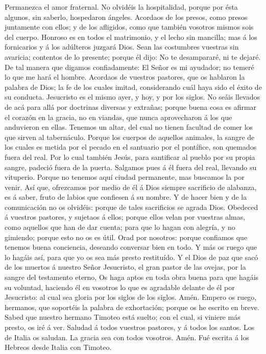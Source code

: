  Permanezca el amor fraternal.  No olvidéis la
hospitalidad, porque por ésta algunos, sin saberlo, hospedaron ángeles.
 Acordaos de los presos, como presos juntamente con ellos; y
de los afligidos, como que también vosotros mismos sois del cuerpo.
 Honroso es en todos el matrimonio, y el lecho sin mancilla;
mas á los fornicarios y á los adúlteros juzgará Dios.  Sean
las costumbres vuestras sin avaricia; contentos de lo presente; porque
él dijo: No te desampararé, ni te dejaré.  De tal manera que
digamos confiadamente: El Señor es mi ayudador; no temeré lo que me hará
el hombre.  Acordaos de vuestros pastores, que os hablaron
la palabra de Dios; la fe de los cuales imitad, considerando cuál haya
sido el éxito de su conducta.  Jesucristo es el mismo ayer,
y hoy, y por los siglos.  No seáis llevados de acá para allá
por doctrinas diversas y extrañas; porque buena cosa es afirmar el
corazón en la gracia, no en viandas, que nunca aprovecharon á los que
anduvieron en ellas.  Tenemos un altar, del cual no tienen
facultad de comer los que sirven al tabernáculo.  Porque
los cuerpos de aquellos animales, la sangre de los cuales es metida por
el pecado en el santuario por el pontífice, son quemados fuera del real.
 Por lo cual también Jesús, para santificar al pueblo por
su propia sangre, padeció fuera de la puerta.  Salgamos
pues á él fuera del real, llevando su vituperio.  Porque no
tenemos aquí ciudad permanente, mas buscamos la por venir. 
Así que, ofrezcamos por medio de él á Dios siempre sacrificio de
alabanza, es á saber, fruto de labios que confiesen á su nombre.
 Y de hacer bien y de la comunicación no os olvidéis:
porque de tales sacrificios se agrada Dios.  Obedeced á
vuestros pastores, y sujetaos á ellos; porque ellos velan por vuestras
almas, como aquellos que han de dar cuenta; para que lo hagan con
alegría, y no gimiendo; porque esto no os es útil.  Orad
por nosotros: porque confiamos que tenemos buena conciencia, deseando
conversar bien en todo.  Y más os ruego que lo hagáis así,
para que yo os sea más presto restituído.  Y el Dios de paz
que sacó de los muertos á nuestro Señor Jesucristo, el gran pastor de
las ovejas, por la sangre del testamento eterno,  Os haga
aptos en toda obra buena para que hagáis su voluntad, haciendo él en
vosotros lo que es agradable delante de él por Jesucristo: al cual sea
gloria por los siglos de los siglos. Amén.  Empero os
ruego, hermanos, que soportéis la palabra de exhortación; porque os he
escrito en breve.  Sabed que nuestro hermano Timoteo está
suelto; con el cual, si viniere más presto, os iré á ver. 
Saludad á todos vuestros pastores, y á todos los santos. Los de Italia
os saludan.  La gracia sea con todos vosotros. Amén. Fué
escrita á los Hebreos desde Italia con Timoteo.
